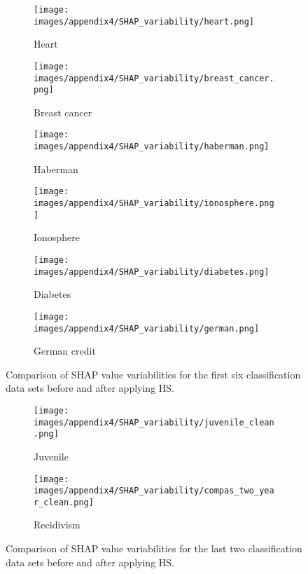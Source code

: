 \begin{figure}[hbt]
    \centering
    \begin{subfigure}[t]{0.45\textwidth}
        \vskip 0pt
        \centering
        \texttt{[image: images/appendix4/SHAP\_variability/heart.png]}
        \caption{Heart}
    \end{subfigure}
    \begin{subfigure}[t]{0.45\textwidth}
        \vskip 0pt
        \centering
        \texttt{[image: images/appendix4/SHAP\_variability/breast\_cancer.png]}
        \caption{Breast cancer}
    \end{subfigure}

    \begin{subfigure}[t]{0.45\textwidth}
        \vskip 0pt
        \centering
        \texttt{[image: images/appendix4/SHAP\_variability/haberman.png]}
        \caption{Haberman}
    \end{subfigure}
    \begin{subfigure}[t]{0.45\textwidth}
        \vskip 0pt
        \centering
        \texttt{[image: images/appendix4/SHAP\_variability/ionosphere.png]}
        \caption{Ionosphere}
    \end{subfigure}

    \begin{subfigure}[t]{0.45\textwidth}
        \vskip 0pt
        \centering
        \texttt{[image: images/appendix4/SHAP\_variability/diabetes.png]}
        \caption{Diabetes}
    \end{subfigure}
    \begin{subfigure}[t]{0.45\textwidth}
        \vskip 0pt
        \centering
        \texttt{[image: images/appendix4/SHAP\_variability/german.png]}
        \caption{German credit}
    \end{subfigure}
    \caption{Comparison of SHAP value variabilities for the first six classification data sets before and after applying HS.}
    \label{fig:apx4-svar1}
\end{figure}

\begin{figure}[hbt]
    \centering
    \begin{subfigure}[t]{0.45\textwidth}
        \vskip 0pt
        \centering
        \texttt{[image: images/appendix4/SHAP\_variability/juvenile\_clean.png]}
        \caption{Juvenile}
    \end{subfigure}
    \begin{subfigure}[t]{0.45\textwidth}
        \vskip 0pt
        \centering
        \texttt{[image: images/appendix4/SHAP\_variability/compas\_two\_year\_clean.png]}
        \caption{Recidivism}
    \end{subfigure}
    \caption{Comparison of SHAP value variabilities for the last two classification data sets before and after applying HS.}
    \label{fig:apx4-svar2}
\end{figure}